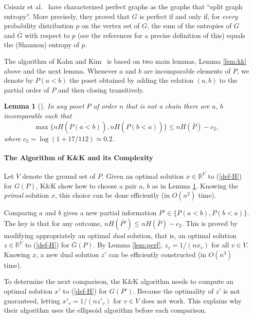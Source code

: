 \documentclass{article} \usepackage{fullpage}
\newtheorem{lemma}{Lemma}
\begin{document}
Csisz{\'a}r et al.~\cite{CKLMS90} have characterized perfect graphs as the graphs that ``split graph entropy''. More precisely, they proved that $G$ is perfect if and only if, for {\em every\/} probability distribution $p$ on the vertex set of $G$, the sum of the entropies of $G$ and $\bar{G}$ with respect to $p$ (see the references for a precise definition of this) equals the (Shannon) entropy of $p$.

The algorithm of Kahn and Kim~\cite{KK95} is based on two main lemmas, Lemma \ref{lem:kk} above and the next lemma. Whenever $a$ and $b$ are incomparable elements of $P$, we denote by $P(a < b)$ the poset obtained by adding the relation $(a,b)$ to the partial order of $P$ and then closing transitively.

\begin{lemma}[\cite{KK95}]
\label{lem:kk2}
In any poset $P$ of order $n$ that is not a chain there are $a$, $b$ incomparable such that
$$
\max \{nH(\overline{P(a<b)}),nH(\overline{P(b<a)})\} \leq nH(\bar{P}) - c_2,
$$
where $c_2 = \log (1 + 17/112) \simeq 0.2$.
\end{lemma}

\paragraph*{The Algorithm of K\&K and its Complexity}

Let $V$ denote the ground set of $P$. Given an optimal solution $x \in \mathbb{R}^V$ to (\ref{def-H}) for $G(P)$, K\&K show how to choose a pair $a$, $b$ as in Lemma \ref{lem:kk2}. Knowing the {\sl primal\/} solution $x$, this choice can be done efficiently (in $O(n^2)$ time).


Comparing $a$ and $b$ gives a new partial information $P' \in \{P(a<b),P(b<a)\}$. The key is that for any outcome, $nH(\bar{P'}) \leq nH(\bar{P})-c_2$. This is proved by modifying appropriately an optimal {\sl dual\/} solution, that is, an optimal solution $z \in \mathbb{R}^V$ to (\ref{def-H}) for $\bar{G}(P)$. By Lemma \ref{lem:perf}, $z_v = 1/(nx_v)$ for all $v \in V$. Knowing $x$, a new dual solution $z'$ can be efficiently constructed (in $O(n^3)$ time).

To determine the next comparison, the K\&K algorithm needs to compute an optimal solution $x'$ to (\ref{def-H}) for $G(P')$. Because the optimality of $z'$ is not guaranteed, letting $x'_v = 1/(nz'_v)$ for $v \in V$ does not work. This explains why their algorithm uses the ellipsoid algorithm before each comparison.
\end{document}
